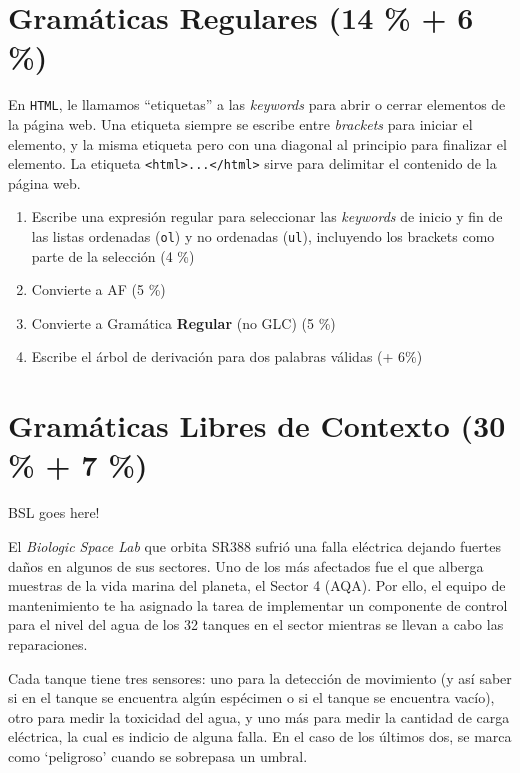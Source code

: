 \documentclass[8pt, onside]{article}
\begin{document}
\section{Gramáticas Regulares (14 \% + 6 \%)}

En \texttt{HTML}, le llamamos ``etiquetas'' a las \textit{keywords} para abrir o cerrar elementos de la página web.
Una etiqueta siempre se escribe entre \textit{brackets} para iniciar el elemento, y la misma etiqueta pero con una diagonal al principio para finalizar el elemento.
La etiqueta \verb|<html>...</html>| sirve para delimitar el contenido de la página web.

\begin{enumerate}[label=\tt \alph*)]
    \itemsep0em
    \item Escribe una expresión regular para seleccionar las \textit{keywords} de inicio y fin de las listas ordenadas (\texttt{ol}) y no ordenadas (\texttt{ul}), incluyendo los brackets como parte de la selección (4 \%)
    \item Convierte a AF (5 \%)
    \item Convierte a Gramática \textbf{Regular} (no GLC) (5 \%)
    \item Escribe el árbol de derivación para dos palabras válidas (+ 6\%)
\end{enumerate}

\section{Gramáticas Libres de Contexto (30 \% + 7 \%)}

BSL goes here!

El \textit{Biologic Space Lab} que orbita \textsc{SR388} sufrió una falla eléctrica dejando fuertes daños en algunos de sus sectores. Uno de los más afectados fue el que alberga muestras de la vida marina del planeta, el Sector 4 (AQA). Por ello, el equipo de mantenimiento te ha asignado la tarea de implementar un componente de control para el nivel del agua de los 32 tanques en el sector mientras se llevan a cabo las reparaciones.

Cada tanque tiene tres sensores: uno para la detección de movimiento (y así saber si en el tanque se encuentra algún espécimen o si el tanque se encuentra vacío), otro para medir la toxicidad del agua, y uno más para medir la cantidad de carga eléctrica, la cual es indicio de alguna falla. En el caso de los últimos dos, se marca como `peligroso' cuando se sobrepasa un umbral.
\end{document}

